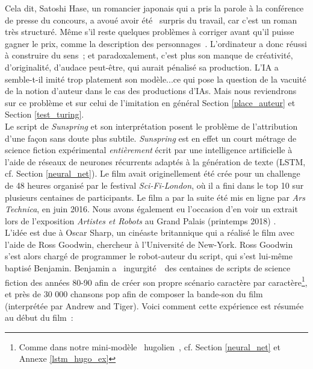 \documentclass{article}
\begin{document}
					Cela dit, Satoshi Hase, un romancier japonais qui a pris la parole à la conférence de presse du concours, a avoué avoir été \guillemotleft~surpris du travail, car c'est un roman très structuré. Même s'il reste quelques problèmes à corriger avant qu'il puisse gagner le prix, comme la description des personnages~\guillemotright. L'ordinateur a donc réussi à construire du sens ; et paradoxalement, c'est plus son manque de créativité, d'originalité, d'audace peut-être, qui aurait pénalisé sa production. L'IA a  semble-t-il imité trop platement son modèle...ce qui pose la question de la vacuité de la notion d'auteur dans le cas des productions d'IAs. Mais nous reviendrons sur ce problème et sur celui de l'imitation en général Section \ref{place_auteur} et Section \ref{test_turing}.\\
					
					Le script de \textit{Sunspring} et son interprétation \autocite{sunspring} posent le problème de l'attribution d'une façon sans doute plus subtile. \textit{Sunspring} est en effet un court métrage de science fiction expérimental \textit{entièrement} écrit par une intelligence artificielle à l'aide de réseaux de neurones récurrents adaptés à la génération de texte (LSTM, cf. Section \ref{neural_net}). Le film avait originellement été crée pour un challenge de 48 heures organisé par le festival \textit{Sci-Fi-London}, où il a fini dans le top 10 sur plusieurs centaines de participants. Le film a par la suite été mis en ligne par \textit{Ars Technica}, en juin 2016. Nous avons également eu l'occasion d'en voir un extrait lors de l'exposition \textit{Artistes et Robots} au Grand Palais (printemps 2018) \autocite{artistes_robots}.\\
					
					L'idée est due à Oscar Sharp, un cinéaste britannique qui a réalisé le film avec l'aide de Ross Goodwin, chercheur à l'Université de New-York. Ross Goodwin s'est alors chargé de programmer le robot-auteur du script, qui s'est lui-même baptisé Benjamin. Benjamin a \guillemotleft~ingurgité~\guillemotright~des centaines de scripts de science fiction des années 80-90 afin de créer son propre scénario caractère par caractère\footnote{Comme dans notre mini-modèle \guillemotleft~hugolien~\guillemotright, cf. Section \ref{neural_net} et Annexe \ref{lstm_hugo_ex}}, et près de 30 000 chansons pop afin de composer la bande-son du film (interprétée par Andrew and Tiger). Voici comment cette expérience est résumée au début du film~:
					
\end{document}

